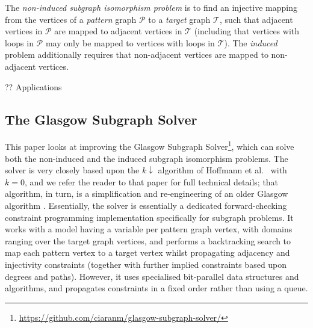 \documentclass[runningheads]{llncs}
\newcommand{\citet}[2]{#1\cite{#2}}
\begin{document}
The \emph{non-induced subgraph isomorphism problem} is to find an injective mapping from the
vertices of a \emph{pattern} graph $\mathcal{P}$ to a \emph{target} graph $\mathcal{T}$, such that
adjacent vertices in $\mathcal{P}$ are mapped to adjacent vertices in $\mathcal{T}$ (including that
vertices with loops in $\mathcal{P}$ may only be mapped to vertices with loops in $\mathcal{T}$).
The \emph{induced} problem additionally requires that non-adjacent vertices are mapped to
non-adjacent vertices.

?? Applications


\subsection{The Glasgow Subgraph Solver}

This paper looks at improving the Glasgow Subgraph
Solver\footnote{\url{https://github.com/ciaranm/glasgow-subgraph-solver/}}, which can solve both the
non-induced and the induced subgraph isomorphism problems.  The solver is very closely based upon
the $k{\downarrow}$ algorithm of \citet{Hoffmann et al.\ }{DBLP:conf/aaai/HoffmannMR17} with $k =
0$, and we refer the reader to that paper for full technical details; that algorithm, in turn, is a
simplification and re-engineering of an older Glasgow algorithm
\cite{DBLP:conf/cp/McCreeshP15,DBLP:conf/lion/KotthoffMS16}.  Essentially, the solver is essentially
a dedicated forward-checking constraint programming implementation specifically for subgraph
problems. It works with a model having a variable per pattern graph vertex, with domains ranging
over the target graph vertices, and performs a backtracking search to map each pattern vertex to a
target vertex whilst propagating adjacency and injectivity constraints (together with further
implied constraints based upon degrees and paths).  However, it uses specialised bit-parallel data
structures and algorithms, and propagates constraints in a fixed order rather than using a queue.
\end{document}
